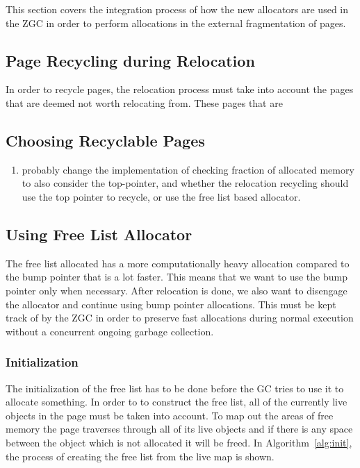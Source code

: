 
This section covers the integration process of how the new allocators are used in the ZGC in order to perform allocations in the external fragmentation of pages.
\subsection{Page Recycling during Relocation}
In order to recycle pages, the relocation process must take into account the pages that are deemed not worth relocating from. These pages that are 
    
\subsection{Choosing Recyclable Pages}

\begin{enumerate}
    \item probably change the implementation of checking fraction of allocated memory to also consider the top-pointer, and whether the relocation recycling should use the top pointer to recycle, or use the free list based allocator.
\end{enumerate}

\subsection{Using Free List Allocator}
The free list allocated has a more computationally heavy allocation compared to the bump pointer that is a lot faster. This means that we want to use the bump pointer only when necessary. After relocation is done, we also want to disengage the allocator and continue using bump pointer allocations. This must be kept track of by the ZGC in order to preserve fast allocations during normal execution without a concurrent ongoing garbage collection.
\subsubsection{Initialization}
The initialization of the free list has to be done before the GC tries to use it to allocate something. In order to to construct the free list, all of the currently live objects in the page must be taken into account. To map out the areas of free memory the page traverses through all of its live objects and if there is any space between the object which is not allocated it will be freed. In Algorithm~\ref{alg:init}, the process of creating the free list from the live map is shown.

